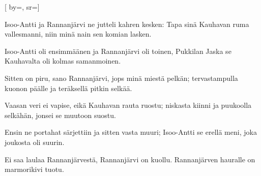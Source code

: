
[
	by={},
	sr={}]

\beginverse*
Isoo-Antti ja Rannanjärvi
ne jutteli kahren kesken:
Tapa sinä Kauhavan ruma vallesmanni,
niin minä nain sen komian lasken.
\endverse

\beginverse*
Isoo-Antti oli ensimmäänen
ja Rannanjärvi oli toinen,
Pukkilan Jaska se Kauhavalta
oli kolmas samanmoinen.
\endverse

\beginverse*
Sitten on piru, sano Rannanjärvi,
jops minä miestä pelkän;
tervastampulla kuonon päälle
ja teräksellä pitkin selkää.
\endverse

\beginverse*
Vaasan veri ei vapise,
eikä Kauhavan rauta ruostu;
niskasta kiinni ja puukoolla selkähän,
jonsei se muutoon suostu.
\endverse

\beginverse*
Ensin ne portahat särjettiin
ja sitten vasta muuri;
Isoo-Antti se erellä meni,
joka joukosta oli suurin.
\endverse

\beginverse*
Ei saa laulaa Rannanjärvestä,
Rannanjärvi on kuollu.
Rannanjärven hauralle
on marmorikivi tuotu.
\endverse
\endsong